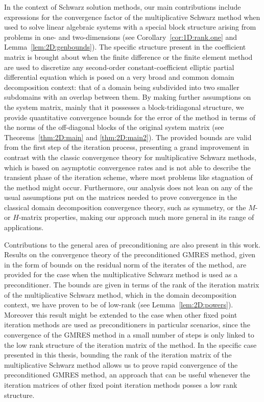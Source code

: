 In the context of Schwarz solution methods, our main contributions include
expressions for the convergence factor of the multiplicative Schwarz method
when used to solve linear algebraic systems with a special block structure arising from problems in one- and two-dimensions (see Corollary~\ref{cor:1D:rank.one} and
Lemma~\ref{lem:2D:genbounds}). The specific structure present in the
coefficient matrix is brought about when the finite difference or the finite
element method are used to discretize any second-order constant-coefficient elliptic partial differential equation which is posed on a very broad
and common domain decomposition context: that of a domain being subdivided into
two smaller subdomains with an overlap between them.
By making further assumptions on the system matrix, mainly that it
possesses a block-tridiagonal structure, we provide quantitative convergence
bounds for the error of the method in terms of the norms of the off-diagonal
blocks of the original system matrix (see Theorems~\ref{thm:2D:main} and
\ref{thm:2D:main2}). The provided bounds are valid from the first step of the
iteration process, presenting a grand improvement in contrast with the classic
convergence theory for multiplicative Schwarz methods, which is based on
asymptotic convergence rates and is not able to describe the transient phase of
the iteration scheme, where most problems like stagnation of the method might
occur. Furthermore, our analysis does not lean on any of the usual assumptions
put on the matrices needed to prove convergence in the classical domain
decomposition convergence theory, such as symmetry, or the $M$- or $H$-matrix
properties, making our approach much more general in its range of applications.

Contributions to the general area of preconditioning are also present in this
work. Results on the convergence theory of the preconditioned GMRES method,
given in the form of bounds on the residual norm of the iterates of the method,
are provided for the case when the multiplicative Schwarz method is used as a
preconditioner. The bounds are given in terms of the rank of the iteration
matrix of the multiplicative Schwarz method, which in the domain decomposition
context, we have proven to be of low-rank (see Lemma~\ref{lem:2D:powers}).
Moreover this result might be extended to the case when other fixed point
iteration methods are used as preconditioners in particular scenarios, since
the convergence of the GMRES method in a small number of steps is only
linked to the low rank structure of the iteration matrix of the method. In the
specific case presented in this thesis, bounding the rank of the iteration
matrix of the multiplicative Schwarz method allows us to prove rapid
convergence of the preconditioned GMRES method, an approach that can be useful
whenever the iteration matrices of other fixed point iteration methods posses a
low rank structure.

